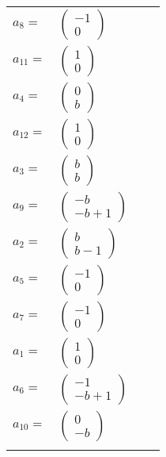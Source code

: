 \documentclass[1p]{elsarticle_modified}
\theoremstyle{definition}
\begin{document}
\begin{tabular}{m{7pt} m{180pt} m{7pt} m{180pt} }
\flushright $a_{8}=$&$\begin{pmatrix}-1\\0\end{pmatrix}$ \\
\flushright $a_{11}=$&$\begin{pmatrix}1\\0\end{pmatrix}$ \\
\flushright $a_{4}=$&$\begin{pmatrix}0\\b\end{pmatrix}$ \\
\flushright $a_{12}=$&$\begin{pmatrix}1\\0\end{pmatrix}$ \\
\flushright $a_{3}=$&$\begin{pmatrix}b\\b\end{pmatrix}$ \\
\flushright $a_{9}=$&$\begin{pmatrix}- b\\- b+1\end{pmatrix}$ \\
\flushright $a_{2}=$&$\begin{pmatrix}b\\b-1\end{pmatrix}$ \\
\flushright $a_{5}=$&$\begin{pmatrix}-1\\0\end{pmatrix}$ \\
\flushright $a_{7}=$&$\begin{pmatrix}-1\\0\end{pmatrix}$ \\
\flushright $a_{1}=$&$\begin{pmatrix}1\\0\end{pmatrix}$ \\
\flushright $a_{6}=$&$\begin{pmatrix}-1\\- b+1\end{pmatrix}$ \\
\flushright $a_{10}=$&$\begin{pmatrix}0\\- b\end{pmatrix}$\\&\end{tabular}
\end{document}
